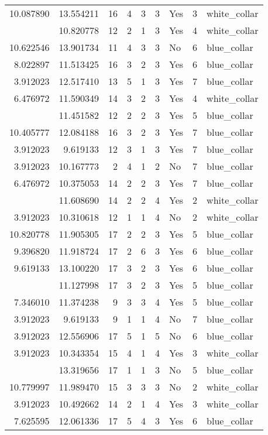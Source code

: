 \documentclass[
]{article}
\begin{document}
\begin{longtable}[t]{rrrrrllrl}
10.087890 & 13.554211 & 16 & 4 & 3 & 3 & Yes & 3 & white\_collar\\
\addlinespace
3.912023 & 10.820778 & 12 & 2 & 1 & 3 & Yes & 4 & white\_collar\\
10.622546 & 13.901734 & 11 & 4 & 3 & 3 & No & 6 & blue\_collar\\
8.022897 & 11.513425 & 16 & 3 & 2 & 3 & Yes & 6 & blue\_collar\\
3.912023 & 12.517410 & 13 & 5 & 1 & 3 & Yes & 7 & blue\_collar\\
6.476972 & 11.590349 & 14 & 3 & 2 & 3 & Yes & 4 & white\_collar\\
\addlinespace
6.476972 & 11.451582 & 12 & 2 & 2 & 3 & Yes & 5 & blue\_collar\\
10.405777 & 12.084188 & 16 & 3 & 2 & 3 & Yes & 7 & blue\_collar\\
3.912023 & 9.619133 & 12 & 3 & 1 & 3 & Yes & 7 & blue\_collar\\
3.912023 & 10.167773 & 2 & 4 & 1 & 2 & No & 7 & blue\_collar\\
6.476972 & 10.375053 & 14 & 2 & 2 & 3 & Yes & 7 & blue\_collar\\
\addlinespace
8.022897 & 11.608690 & 14 & 2 & 2 & 4 & Yes & 2 & white\_collar\\
3.912023 & 10.310618 & 12 & 1 & 1 & 4 & No & 2 & white\_collar\\
10.820778 & 11.905305 & 17 & 2 & 2 & 3 & Yes & 5 & blue\_collar\\
9.396820 & 11.918724 & 17 & 2 & 6 & 3 & Yes & 6 & blue\_collar\\
9.619133 & 13.100220 & 17 & 3 & 2 & 3 & Yes & 6 & blue\_collar\\
\addlinespace
9.121509 & 11.127998 & 17 & 3 & 2 & 3 & Yes & 5 & blue\_collar\\
7.346010 & 11.374238 & 9 & 3 & 3 & 4 & Yes & 5 & blue\_collar\\
3.912023 & 9.619133 & 9 & 1 & 1 & 4 & No & 7 & blue\_collar\\
3.912023 & 12.556906 & 17 & 5 & 1 & 5 & No & 6 & blue\_collar\\
3.912023 & 10.343354 & 15 & 4 & 1 & 4 & Yes & 3 & white\_collar\\
\addlinespace
3.912023 & 13.319656 & 17 & 1 & 1 & 3 & No & 5 & blue\_collar\\
10.779997 & 11.989470 & 15 & 3 & 3 & 3 & No & 2 & white\_collar\\
3.912023 & 10.492662 & 14 & 2 & 1 & 4 & Yes & 3 & white\_collar\\
7.625595 & 12.061336 & 17 & 5 & 4 & 3 & Yes & 6 & blue\_collar\\

\end{longtable}
\end{document}
